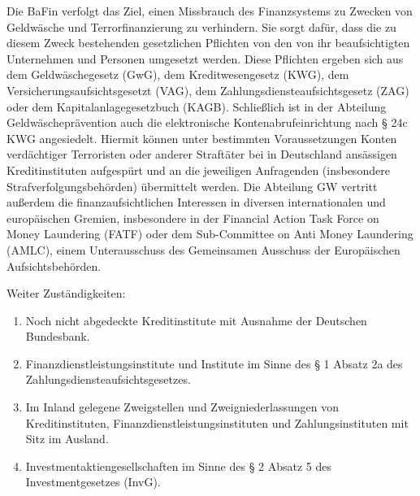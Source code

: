\documentclass{article}
\begin{document}
\begin{enumerate}
                    Die BaFin verfolgt das Ziel, einen Missbrauch des Finanzsystems zu Zwecken von Geldwäsche und Terrorfinanzierung zu verhindern. Sie sorgt dafür, dass die zu diesem Zweck bestehenden gesetzlichen Pflichten von den von ihr beaufsichtigten Unternehmen und Personen umgesetzt werden. Diese Pflichten ergeben sich aus dem Geldwäschegesetz (GwG), dem Kreditwesengesetz (KWG), dem Versicherungsaufsichtsgesetzt (VAG), dem Zahlungsdiensteaufsichtsgesetz (ZAG) oder dem Kapitalanlagegesetzbuch (KAGB). Schließlich ist in der Abteilung Geldwäscheprävention auch die elektronische Kontenabrufeinrichtung nach § 24c KWG angesiedelt. Hiermit können unter bestimmten Voraussetzungen Konten verdächtiger Terroristen oder anderer Straftäter bei in Deutschland ansässigen Kreditinstituten aufgespürt und an die jeweiligen Anfragenden (insbesondere Strafverfolgungsbehörden) übermittelt werden. Die Abteilung GW vertritt außerdem die finanzaufsichtlichen Interessen in diversen internationalen und europäischen Gremien, insbesondere in der Financial Action Task Force on Money Laundering (FATF) oder dem Sub-Committee on Anti Money Laundering (AMLC), einem Unterausschuss des Gemeinsamen Ausschuss der Europäischen Aufsichtsbehörden.
                   
                    Weiter Zuständigkeiten: 
                    \begin{enumerate}
                        \item
                            
                            Noch nicht abgedeckte Kreditinstitute mit Ausnahme der Deutschen Bundesbank.

                        \item

                            Finanzdienstleistungsinstitute und Institute im Sinne des § 1 Absatz
                            2a des Zahlungsdiensteaufsichtsgesetzes.

                        \item

                            Im Inland gelegene Zweigstellen und Zweigniederlassungen von
                            Kreditinstituten, Finanzdienstleistungsinstituten und
                            Zahlungsinstituten mit Sitz im Ausland.

                        \item

                            Investmentaktiengesellschaften im Sinne des § 2 Absatz 5 des
                            Investmentgesetzes (InvG).


\end{enumerate}
\end{enumerate}
\end{document}
